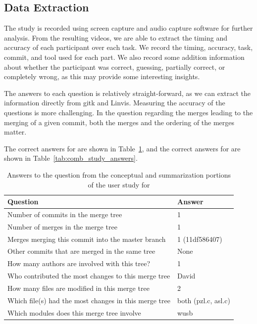 \subsection{Data Extraction}
\label{sub:data_extraction}

The study is recorded using screen capture and audio capture software
for further analysis. From the resulting videos, we are able to extract
the timing and accuracy of each participant over each task. We record
the timing, accuracy, task, commit, and tool used for each part. We also
record some addition information about whether the participant was
correct, guessing, partially correct, or completely wrong, as this may
provide some interesting insights.

The answers to each question is relatively straight-forward, as we can
extract the information directly from gitk and Linvis. Measuring the
accuracy of the questions is more challenging. In the question regarding
the merges leading to the merging of a given commit, both the merges and
the ordering of the merges matter.

The correct answers for \comA are shown in
Table~\ref{tab:coma_study_answers}, and the correct answers for \comB are
shown in Table~\ref{tab:comb_study_answers}.

\begin{table}[htpb]
  \centering
  \caption{Answers to the question from the conceptual and summarization portions of the user study for \comA}
  \label{tab:coma_study_answers}
  \begin{tabular}{l|l}
    Question                                              & Answer \\\hline\hline
    Number of commits in the merge tree                   & 1\\
    Number of merges in the merge tree                    & 1\\\hline
    Merges merging this commit into the master branch     & 1 (11df586407)\\
    Other commits that are merged in the same tree        & None\\
    How many authors are involved with this tree?         & 1\\
    Who contributed the most changes to this merge tree   & David\\
    How many files are modified in this merge tree        & 2\\
    Which file(s) had the most changes in this merge tree & both (pzl.c, asl.c)\\
    Which modules does this merge tree involve & wusb
  \end{tabular}
\end{table}


